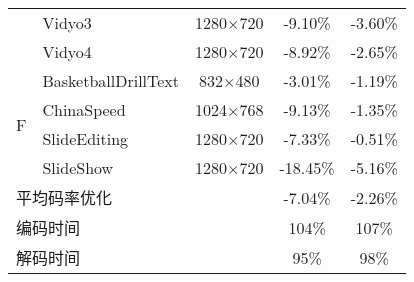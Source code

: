 \begin{table}[!p]
\begin{tabular}{@{}clccc@{}}
                                         & Vidyo3                                    & 1280$\times$720         & -9.10\%                            & -3.60\%                       \\
                                         & Vidyo4                                    & 1280$\times$720         & -8.92\%                            & -2.65\%                       \\
        \multirow{4}{*}{F}               & BasketballDrillText                       & 832$\times$480          & -3.01\%                            & -1.19\%                       \\
                                         & ChinaSpeed                                & 1024$\times$768         & -9.13\%                            & -1.35\%                       \\
                                         & SlideEditing                              & 1280$\times$720         & -7.33\%                            & -0.51\%                       \\
                                         & SlideShow                                 & 1280$\times$720         & -18.45\%                           & -5.16\%                       \\ \midrule
        \multicolumn{2}{l}{平均码率优化} &                                           & -7.04\%                 & -2.26\%                                                            \\ \midrule
        \multicolumn{2}{l}{编码时间}     &                                           & 104\%                   & 107\%                                                              \\ \midrule
        \multicolumn{2}{l}{解码时间}     &                                           & 95\%                    & 98\%                                                               \\ \bottomrule
    \end{tabular}
\end{table}

